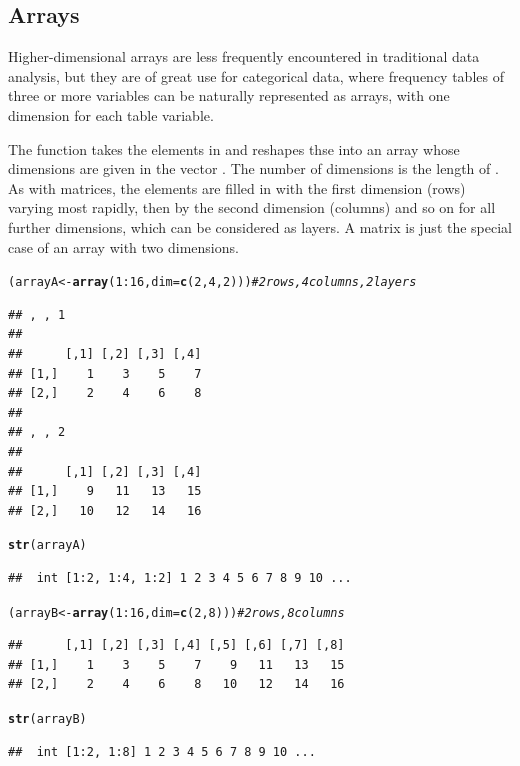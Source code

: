 \documentclass[11pt]{book}\usepackage[]{graphicx}\usepackage[]{color}
\makeatletter
\newcommand{\hlnum}[1]{\textcolor[rgb]{0.686,0.059,0.569}{#1}}%
\newcommand{\hlcom}[1]{\textcolor[rgb]{0.678,0.584,0.686}{\textit{#1}}}%
\newcommand{\hlopt}[1]{\textcolor[rgb]{0,0,0}{#1}}%
\newcommand{\hlstd}[1]{\textcolor[rgb]{0.345,0.345,0.345}{#1}}%
\newcommand{\hlkwb}[1]{\textcolor[rgb]{0.69,0.353,0.396}{#1}}%
\newcommand{\hlkwc}[1]{\textcolor[rgb]{0.333,0.667,0.333}{#1}}%
\newcommand{\hlkwd}[1]{\textcolor[rgb]{0.737,0.353,0.396}{\textbf{#1}}}%
\newenvironment{kframe}{%
 \def\at@end@of@kframe{}%
 \ifinner\ifhmode%
  \def\at@end@of@kframe{\end{minipage}}%
  \begin{minipage}{\columnwidth}%
 \fi\fi%
 \def\FrameCommand##1{\hskip\@totalleftmargin \hskip-\fboxsep
 \colorbox{shadecolor}{##1}\hskip-\fboxsep
     \hskip-\linewidth \hskip-\@totalleftmargin \hskip\columnwidth}%
 \MakeFramed {\advance\hsize-\width
   \@totalleftmargin\z@ \linewidth\hsize
   \@setminipage}}%
 {\par\unskip\endMakeFramed%
 \at@end@of@kframe}
\newenvironment{knitrout}{}{} %
\renewenvironment{knitrout}{\small\renewcommand{\baselinestretch}{.85}}{} %
\makeatother
\begin{document}
\subsection{Arrays}
Higher-dimensional arrays are less frequently encountered in traditional data analysis,
but they are of great use for categorical data, where frequency tables of three or more
variables can be naturally represented as arrays, with one dimension for each
table variable.

The function  takes the elements in  and
reshapes thse into an array whose dimensions are given in the vector .
The number of dimensions is the length of .  As with matrices, the
elements are filled in with the first dimension (rows) varying most rapidly,
then by the second dimension (columns) and so on for all further dimensions,
which can be considered as layers.
A matrix is just the special case of an array with two dimensions.

\begin{knitrout}
\color{fgcolor}\begin{kframe}
\begin{alltt}
\hlstd{(arrayA} \hlkwb{<-} \hlkwd{array}\hlstd{(}\hlnum{1}\hlopt{:}\hlnum{16}\hlstd{,} \hlkwc{dim}\hlstd{=}\hlkwd{c}\hlstd{(}\hlnum{2}\hlstd{,} \hlnum{4}\hlstd{,} \hlnum{2}\hlstd{)))}     \hlcom{# 2 rows, 4 columns, 2 layers}
\end{alltt}
\begin{verbatim}
## , , 1
## 
##      [,1] [,2] [,3] [,4]
## [1,]    1    3    5    7
## [2,]    2    4    6    8
## 
## , , 2
## 
##      [,1] [,2] [,3] [,4]
## [1,]    9   11   13   15
## [2,]   10   12   14   16
\end{verbatim}
\begin{alltt}
\hlkwd{str}\hlstd{(arrayA)}
\end{alltt}
\begin{verbatim}
##  int [1:2, 1:4, 1:2] 1 2 3 4 5 6 7 8 9 10 ...
\end{verbatim}
\begin{alltt}
\hlstd{(arrayB} \hlkwb{<-} \hlkwd{array}\hlstd{(}\hlnum{1}\hlopt{:}\hlnum{16}\hlstd{,} \hlkwc{dim}\hlstd{=}\hlkwd{c}\hlstd{(}\hlnum{2}\hlstd{,} \hlnum{8}\hlstd{)))}        \hlcom{# 2 rows, 8 columns}
\end{alltt}
\begin{verbatim}
##      [,1] [,2] [,3] [,4] [,5] [,6] [,7] [,8]
## [1,]    1    3    5    7    9   11   13   15
## [2,]    2    4    6    8   10   12   14   16
\end{verbatim}
\begin{alltt}
\hlkwd{str}\hlstd{(arrayB)}
\end{alltt}
\begin{verbatim}
##  int [1:2, 1:8] 1 2 3 4 5 6 7 8 9 10 ...
\end{verbatim}
\end{kframe}
\end{knitrout}
\end{document}
